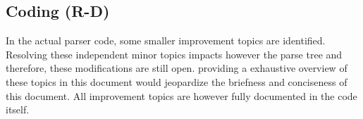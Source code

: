 

\subsection{Coding (R-D)}
In the actual parser code, some smaller improvement topics are identified.
Resolving these independent minor topics impacts however the parse tree and therefore, these modifications are still open.
providing a exhaustive overview of these topics in this document would jeopardize the briefness and conciseness of this document.
All improvement topics are however fully documented in the code itself.